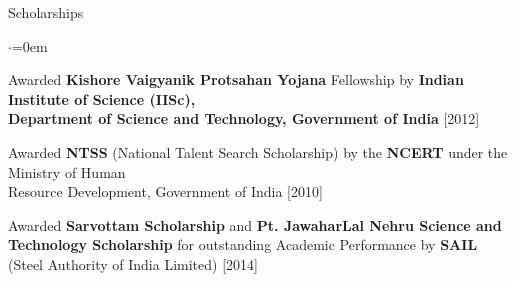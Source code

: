 \documentclass[a4paper,8pt]{resume}%
\begin{document}
\hfill \break
\begin{rSection}{Scholarships}
\begin{list}{$\cdot$}{\leftmargin=0em}
{
\item Awarded \textbf{Kishore Vaigyanik Protsahan Yojana} Fellowship by \textbf{Indian Institute of Science (IISc),\\} \textbf{Department of Science and Technology, Government of India} \hfill [2012]
\item Awarded \textbf{NTSS} (National Talent Search Scholarship) by the \textbf{NCERT} under the Ministry of Human \\Resource Development, Government of India \hfill [2010]
\item Awarded \textbf{Sarvottam Scholarship} and \textbf{Pt. JawaharLal Nehru Science and Technology Scholarship} for outstanding Academic Performance by \textbf{SAIL} (Steel Authority of India Limited) \hfill [2014]
}
\end{list}
\end{rSection}
\vspace{1.1em}
\end{document}
